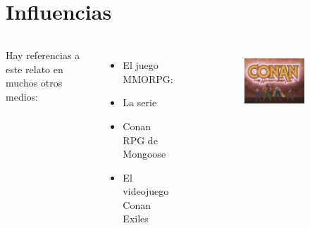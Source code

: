 \section{Influencias}
\note[itemize]{
	\item
}

\begin{frame}{}
	\begin{columns}
		Hay referencias a este relato en muchos otros medios:
		\begin{itemize}
			\item El juego MMORPG: 
			\item La serie 
			\item Conan RPG de Mongoose
			\item El videojuego Conan Exiles
		\end{itemize}
		\begin{figure}[htp]
			\centering
			\begin{subfigure}[b]{0.3\textwidth}
				\includegraphics[width=\textwidth]{img/otros/Conantheadventurerlogo}
			\end{subfigure}
			~
			\begin{subfigure}[b]{0.3\textwidth}

\end{subfigure}
\end{figure}
\end{columns}
\end{frame}
